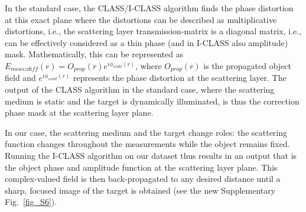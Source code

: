 \documentclass[12pt]{article}
\newenvironment{ourresponse}
    {\begin{tcolorbox}[width=\linewidth,breakable,enhanced,colback=gray!5,colframe=responsecolor!50,title=Response,left=5pt,right=5pt]}
    {\end{tcolorbox}}
\begin{document}
\begin{enumerate}[label=\arabic*.]
\begin{ourresponse}
    In the standard case, the CLASS/I-CLASS algorithm finds the phase distortion at this exact plane where the distortions can be described as multiplicative distortions, i.e., the scattering layer transmission-matrix is a diagonal matrix, i.e., can be effectively considered as a thin phase (and in I-CLASS also amplitude) mask. Mathematically, this can be represented as $E_{meas zdiff}(r)=O_{prop}(r)e^{i\phi_{scatt}(r)}$, where $O_{prop}(r)$ is the propagated object field and $e^{i\phi_{scatt}(r)}$ represents the phase distortion at the scattering layer. The output of the CLASS algorithm in the standard case, where the scattering medium is static and the target is dynamically illuminated, is thus the correction phase mask at the scattering layer plane. 

    In our case, the scattering medium and the target change roles: the scattering function changes throughout the measurements while the object remains fixed. Running the I-CLASS algorithm on our dataset thus results in an output that is the object phase and amplitude function at the scattering layer plane. This complex-valued field is then back-propagated to any desired distance until a sharp, focused image of the target is obtained (see the new Supplementary Fig.~\ref{fig_S6}).

\end{ourresponse}
\end{enumerate}
\end{document}

